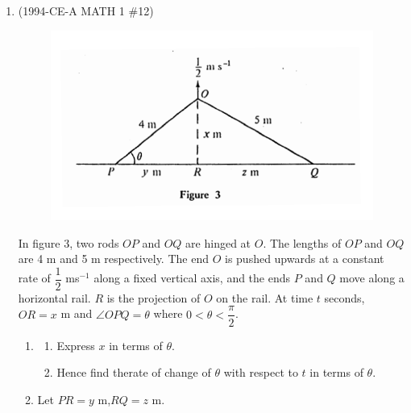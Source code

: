 \documentclass[12pt]{article}
\begin{document}
\begin{enumerate}
            \hrulefill
            
            \hrulefill
            
            \hrulefill
            
            \hrulefill
            
            \hrulefill
            
            \hrulefill
            
            \hrulefill

        \pagebreak
        \item (1994-CE-A MATH 1 \#12) 
        \begin{figure}[H]
            \centering
            \includegraphics[scale=1.4]{1994CE_A_MATH_1_12.png}
        \end{figure}
        In figure 3, two rods $OP$ and $OQ$ are hinged at $O$. The lengths of $OP$ and $OQ$ are 4 m and 5 m respectively. The end $O$ is pushed upwards at a constant rate of $\dfrac{1}{2}$ ms$^{-1}$ along a fixed vertical axis, and the ends $P$ and $Q$ move along a horizontal rail. $R$ is the projection of $O$ on the rail. At time $t$ seconds, $OR = x$ m and $\angle OPQ=\theta$ where $0<\theta<\dfrac{\pi}{2}$.\begin{enumerate}
            \item \begin{enumerate}
                \item Express $x$ in terms of $\theta$. 
                \item Hence find therate of change of $\theta$ with respect to $t$ in terms of $\theta$.
            \end{enumerate}
            \item Let $PR=y$ m,$RQ=z$ m.\begin{enumerate}

\end{enumerate}
\end{enumerate}
\end{enumerate}
\end{document}

